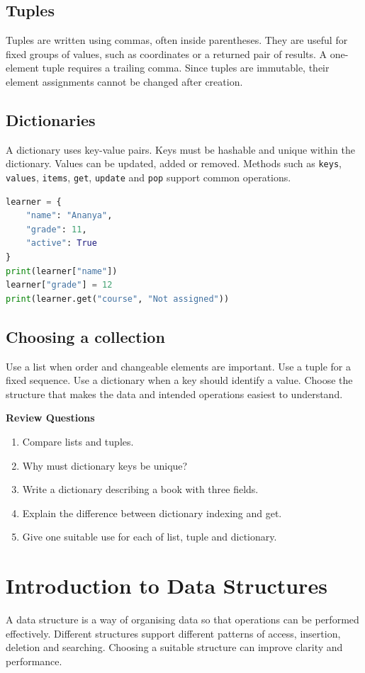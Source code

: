 \documentclass[11pt,openany,oneside]{book}
\newcommand{\reviewtitle}{\par\noindent\textbf{\color{Navy}Review Questions}\par}
\begin{document}
\section{Tuples}
Tuples are written using commas, often inside parentheses. They are useful for fixed groups of values, such as coordinates or a returned pair of results. A one-element tuple requires a trailing comma. Since tuples are immutable, their element assignments cannot be changed after creation.

\section{Dictionaries}
A dictionary uses key-value pairs. Keys must be hashable and unique within the dictionary. Values can be updated, added or removed. Methods such as \texttt{keys}, \texttt{values}, \texttt{items}, \texttt{get}, \texttt{update} and \texttt{pop} support common operations.

\begin{lstlisting}[style=webcode,language=Python]
learner = {
    "name": "Ananya",
    "grade": 11,
    "active": True
}
print(learner["name"])
learner["grade"] = 12
print(learner.get("course", "Not assigned"))
\end{lstlisting}

\section{Choosing a collection}
Use a list when order and changeable elements are important. Use a tuple for a fixed sequence. Use a dictionary when a key should identify a value. Choose the structure that makes the data and intended operations easiest to understand.

\reviewtitle
\begin{enumerate}
\item Compare lists and tuples.
\item Why must dictionary keys be unique?
\item Write a dictionary describing a book with three fields.
\item Explain the difference between dictionary indexing and get.
\item Give one suitable use for each of list, tuple and dictionary.
\end{enumerate}

\chapter{Introduction to Data Structures}
A data structure is a way of organising data so that operations can be performed effectively. Different structures support different patterns of access, insertion, deletion and searching. Choosing a suitable structure can improve clarity and performance.
\end{document}
